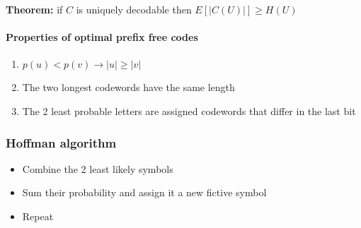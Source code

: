 \documentclass{article}
\begin{document}
\textbf{Theorem:} if $C$ is uniquely decodable then
$E[|C(U)|] \geq H(U)$

\paragraph{Properties of optimal prefix free
codes}\label{properties-of-optimal-prefix-free-codes}

\begin{enumerate}
\item
  $p(u) < p(v) \to |u| \geq |v|$
\item
  The two longest codewords have the same length
\item
  The 2 least probable letters are assigned codewords that differ in the
  last bit
\end{enumerate}

\subsubsection{Hoffman algorithm}\label{hoffman-algorithm}

\begin{itemize}
\item
  Combine the 2 least likely symbols
\item
  Sum their probability and assign it a new fictive symbol
\item
  Repeat
\end{itemize}
\end{document}
